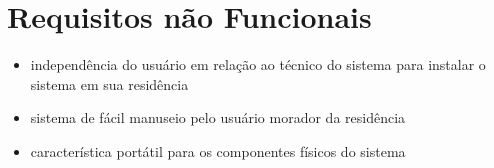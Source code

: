 \section{Requisitos não Funcionais}

\begin{itemize}
	\item{independência do usuário em relação ao técnico do sistema para instalar o sistema em sua residência}
	\item{sistema de fácil manuseio pelo usuário morador da residência}
	\item{característica portátil para os componentes físicos do sistema}
\end{itemize}



